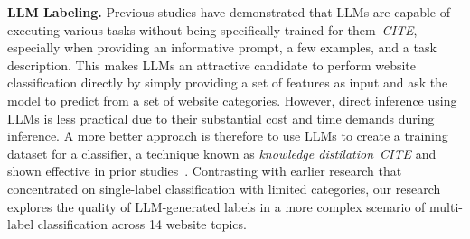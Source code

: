 \textbf{LLM Labeling.} Previous studies have demonstrated that LLMs are capable of executing various tasks without being specifically trained for them~\textit{CITE}, especially when providing an informative prompt, a few examples, and a task description. This makes LLMs an attractive candidate to perform website classification directly by simply providing a set of features as input and ask the model to predict from a set of website categories.
However, direct inference using LLMs is less practical due to their substantial cost and time demands during inference. A more better approach is therefore to use LLMs to create a training dataset for a classifier, a technique known as \textit{knowledge distilation}~\textit{CITE} and shown  effective in prior studies~\cite{reduce-labeling-cost, prompt-tuning, is-gpt3-good-annot, annollm}. Contrasting with earlier research that concentrated on single-label classification with limited categories, our research explores the quality of LLM-generated labels in a more complex scenario of multi-label classification across 14 website topics.